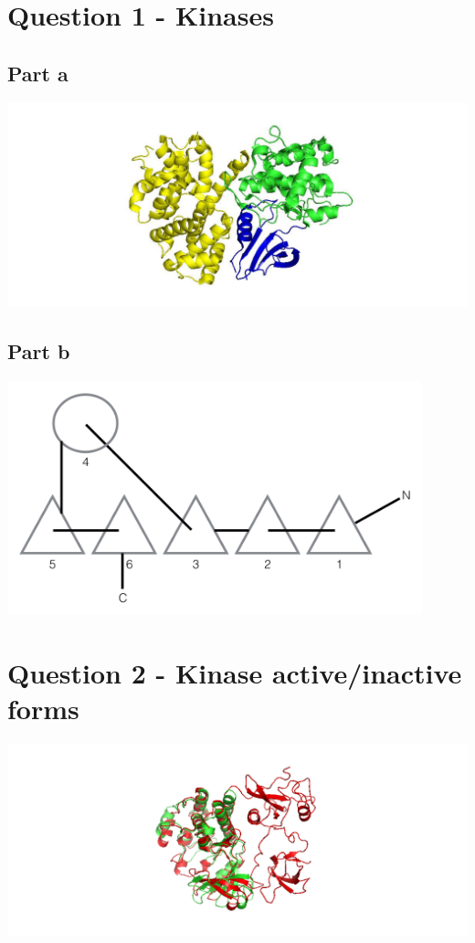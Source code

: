 \documentclass[11pt, a4paper,titlepage]{article}
\begin{document}
\renewcommand{\thesubsubsection}{\alph{subsubsection}.)}

\setcounter{tocdepth}{3}
\tableofcontents
\clearpage


\section{Question 1 - Kinases}
\subsection{Part a}
\includegraphics[width=15cm]{./Figures/1a.jpg}

\subsection{Part b}
\includegraphics[width=12cm]{./Figures/1b.png}

\section{Question 2 - Kinase active/inactive forms}
\includegraphics[width=15cm]{./Figures/2a.png}
\end{document}
